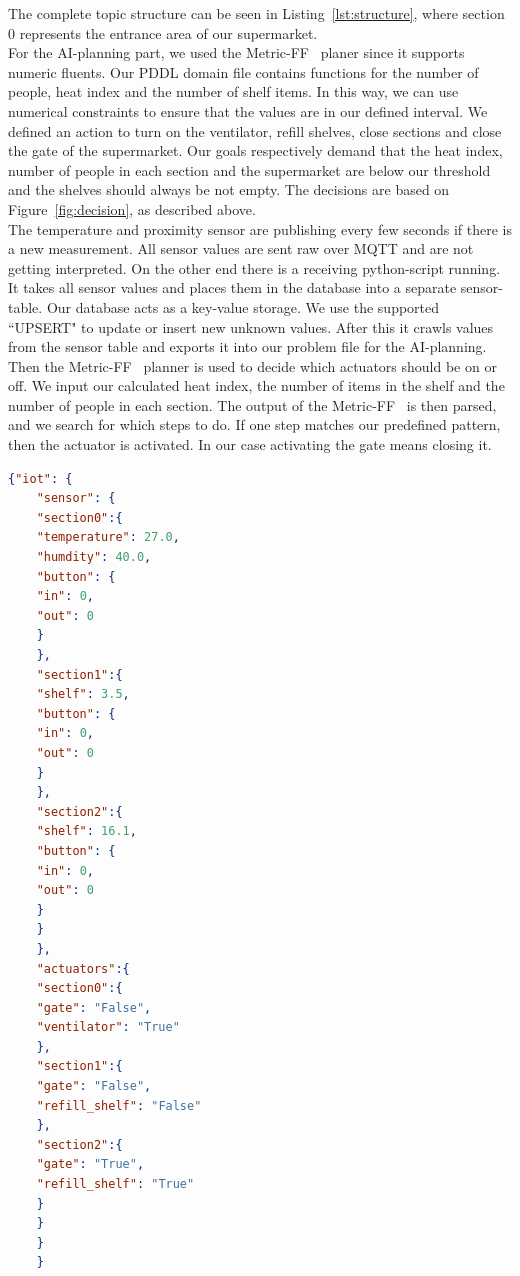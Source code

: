 \documentclass[runningheads]{llncs}
\begin{document}
	The complete topic structure can be seen in Listing~\ref{lst:structure}, where section 0 represents the entrance area of our supermarket.
	\\ \linebreak
	For the AI-planning part, we used the Metric-FF~\cite{ff} planer since it supports numeric fluents.
	Our PDDL domain file contains functions for the number of people, heat index and the number of shelf items. 
	In this way, we can use numerical constraints to ensure that the values are in our defined interval. 
	We defined an action to turn on the ventilator, refill shelves, close sections and close the gate of the supermarket. 
	Our goals respectively demand that the heat index, number of people in each section and the supermarket are below our threshold and the shelves should always be not empty. 
	The decisions are based on Figure~\ref{fig:decision}, as described above. 
	\\ \linebreak
	The temperature and proximity sensor are publishing every few seconds if there is a new measurement. 
	All sensor values are sent raw over MQTT and are not getting interpreted. 
	On the other end there is a receiving python-script running. It takes all sensor values and places them in the database into a separate sensor-table. 
	Our database acts as a key-value storage.
	We use the supported ``UPSERT" to update or insert new unknown values.
	After this it crawls values from the sensor table and exports it into our problem file for the AI-planning. 
	Then the Metric-FF~\cite{ff} planner is used to decide which actuators should be on or off. 
	We input our calculated heat index, the number of items in the shelf and the number of people in each section. 
	The output of the Metric-FF~\cite{ff} is then parsed, and we search for which steps to do. 
	If one step matches our predefined pattern, then the actuator is activated. 
	In our case activating the gate means closing it. %
	\begin{lstlisting}[language=json,firstnumber=1,caption={The used MQTT topic structure.},captionpos=b,label={lst:structure}]
	{"iot": {
	"sensor": {
	"section0":{
	"temperature": 27.0,
	"humdity": 40.0,
	"button": {
	"in": 0,
	"out": 0
	}
	},
	"section1":{
	"shelf": 3.5,
	"button": {
	"in": 0,
	"out": 0
	}
	},
	"section2":{
	"shelf": 16.1,
	"button": {
	"in": 0,
	"out": 0
	}
	}
	},
	"actuators":{
	"section0":{
	"gate": "False",
	"ventilator": "True"
	},
	"section1":{
	"gate": "False",
	"refill_shelf": "False"
	},
	"section2":{
	"gate": "True",
	"refill_shelf": "True"
	}
	}
	}
	}
	\end{lstlisting}
\end{document}
